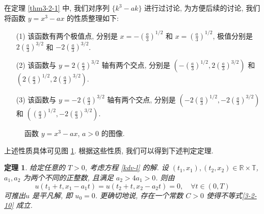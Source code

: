 \documentclass[master]{cugthesis}
\newcommand\R{\ensuremath{\mathbb{R}}}
\newcommand\T{\ensuremath{\mathbb{T}}}
\newtheorem{theorem}{定理}[chapter]
\begin{document}
在定理 \ref{thm3-2-1} 中, 我们对序列 $\lbrace k^3-ak\rbrace$ 进行过讨论, 为方便后续的讨论, 我们将函数 $y=x^3-ax$ 的性质整理如下:
    \begin{enumerate}
        \item [(1)] 该函数有两个极值点, 分别是 $x=-\left(\frac{a}{3}\right)^{1 /2}$ 和 $x=\left(\frac{a}{3}\right)^{1 /2}$, 极值分别是 $2\left(\frac{a}{3}\right)^{3 /2}$ 和 $-2\left(\frac{a}{3}\right)^{3 /2}$. 
        \item[(2)] 该函数与 $y=2\left(\frac{a}{3}\right)^{3 /2}$ 轴有两个交点, 分别是 $\left(-\left(\frac{a}{3}\right)^{1 /2},2\left(\frac{a}{3}\right)^{3 /2}\right)$ 和 $\left(2\left(\frac{a}{3}\right)^{1 /2},2\left(\frac{a}{3}\right)^{3 /2}\right)$.
        \item[(3)] 该函数与 $y=-2\left(\frac{a}{3}\right)^{3 /2}$ 轴有两个交点, 分别是 $\left(-2\left(\frac{a}{3}\right)^{1 /2},-2\left(\frac{a}{3}\right)^{3 /2}\right)$ 和 $\left(\left(\frac{a}{3}\right)^{1 /2},-2\left(\frac{a}{3}\right)^{3 /2}\right)$.
    \end{enumerate}
    \begin{figure}[ht]
        \centering
        \caption{函数 $y=x^3-ax$, $a>0$ 的图像.}
        \label{fig5}
    \end{figure}
    上述性质具体可见图 \ref{fig5}. 根据这些性质, 我们可以得到下述判定定理.
        \begin{theorem}\label{thm-3-2-3}
    给定任意的 $T>0$, 考虑方程 \eqref{kdv-l} 的解. 设 $(t_1,x_1), (t_2,x_2)\in \R\times \T$, $a_1,a_2$ 为两个不同的正整数, 且满足 $a_2>4a_1>0$. 则由 
    \begin{equation*}
        u(t_1+t,x_1-a_1t)=u(t_2+t,x_2-a_2t)=0,\quad \forall t\in (0,T)
    \end{equation*}
    可推出$u$ 是平凡解, 即 $u_0=0$. 更确切地说, 存在一个常数 $C>0$ 使得不等式\eqref{3-2-10}
    成立.
    \end{theorem}
\end{document}
